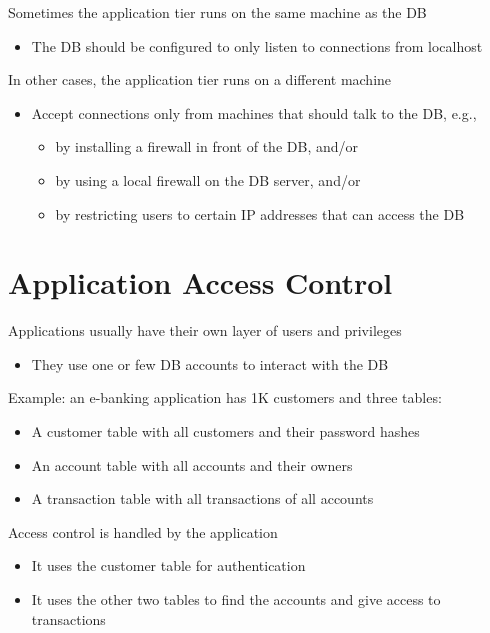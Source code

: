 \documentclass[11pt]{article}
\begin{document}
Sometimes the application tier runs on the same machine as the DB
\begin{itemize}
	\item The DB should be configured to only listen to connections from localhost
\end{itemize}

In other cases, the application tier runs on a different machine
\begin{itemize}
	\item Accept connections only from machines that should talk to the DB, e.g., 
		\begin{itemize}
			\item by installing a firewall in front of the DB, and/or
			\item by using a local firewall on the DB server, and/or
			\item by restricting users to certain IP addresses that can access the DB
		\end{itemize}
\end{itemize}

\section*{Application Access Control}

Applications usually have their own layer of users and privileges
\begin{itemize}
	\item They use one or few DB accounts to interact with the DB
\end{itemize}

Example: an e-banking application has 1K customers and three tables:
\begin{itemize}
	\item A customer table with all customers and their password hashes
	\item An account table with all accounts and their owners
	\item A transaction table with all transactions of all accounts
\end{itemize}

Access control is handled by the application
\begin{itemize}
	\item It uses the customer table for authentication
	\item It uses the other two tables to find the accounts and give access to transactions
\end{itemize}
\end{document}
